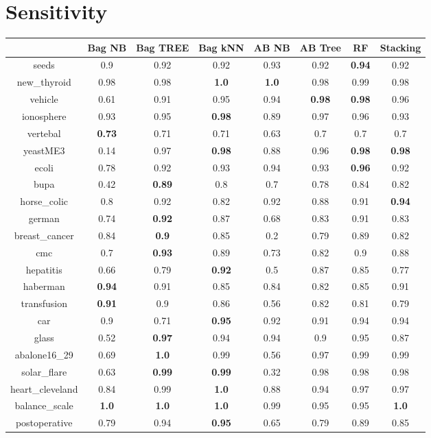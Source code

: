 \documentclass{article}%
\begin{document}
%
\section*{Sensitivity}%
\begin{tabular}{c|ccccccc}%
&Bag NB&Bag TREE&Bag kNN&AB NB&AB Tree&RF&Stacking\\%
\hline%
seeds&0.9&0.92&0.92&0.93&0.92&\textbf{0.94}&0.92\\%
new\_thyroid&0.98&0.98&\textbf{1.0}&\textbf{1.0}&0.98&0.99&0.98\\%
vehicle&0.61&0.91&0.95&0.94&\textbf{0.98}&\textbf{0.98}&0.96\\%
ionosphere&0.93&0.95&\textbf{0.98}&0.89&0.97&0.96&0.93\\%
vertebal&\textbf{0.73}&0.71&0.71&0.63&0.7&0.7&0.7\\%
yeastME3&0.14&0.97&\textbf{0.98}&0.88&0.96&\textbf{0.98}&\textbf{0.98}\\%
ecoli&0.78&0.92&0.93&0.94&0.93&\textbf{0.96}&0.92\\%
bupa&0.42&\textbf{0.89}&0.8&0.7&0.78&0.84&0.82\\%
horse\_colic&0.8&0.92&0.82&0.92&0.88&0.91&\textbf{0.94}\\%
german&0.74&\textbf{0.92}&0.87&0.68&0.83&0.91&0.83\\%
breast\_cancer&0.84&\textbf{0.9}&0.85&0.2&0.79&0.89&0.82\\%
cmc&0.7&\textbf{0.93}&0.89&0.73&0.82&0.9&0.88\\%
hepatitis&0.66&0.79&\textbf{0.92}&0.5&0.87&0.85&0.77\\%
haberman&\textbf{0.94}&0.91&0.85&0.84&0.82&0.85&0.91\\%
transfusion&\textbf{0.91}&0.9&0.86&0.56&0.82&0.81&0.79\\%
car&0.9&0.71&\textbf{0.95}&0.92&0.91&0.94&0.94\\%
glass&0.52&\textbf{0.97}&0.94&0.94&0.9&0.95&0.87\\%
abalone16\_29&0.69&\textbf{1.0}&0.99&0.56&0.97&0.99&0.99\\%
solar\_flare&0.63&\textbf{0.99}&\textbf{0.99}&0.32&0.98&0.98&0.98\\%
heart\_cleveland&0.84&0.99&\textbf{1.0}&0.88&0.94&0.97&0.97\\%
balance\_scale&\textbf{1.0}&\textbf{1.0}&\textbf{1.0}&0.99&0.95&0.95&\textbf{1.0}\\%
postoperative&0.79&0.94&\textbf{0.95}&0.65&0.79&0.89&0.85\\%
\end{tabular}
\end{document}
